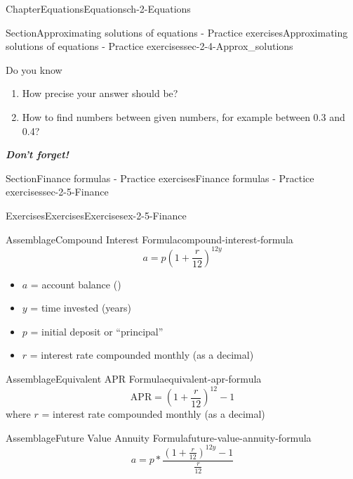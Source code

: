 \documentclass[twoside,11pt,]{book}
\newcommand{\alert}[1]{\textbf{\textit{#1}}}
\numberwithin{equation}{section}
\begin{document}
\begin{chapterptx}{Chapter}{Equations}{}{Equations}{}{}{ch-2-Equations}
\begin{sectionptx}{Section}{Approximating solutions of equations - Practice exercises}{}{Approximating solutions of equations - Practice exercises}{}{}{sec-2-4-Approx_solutions}
\begin{conclusion}{Do you know \textellipsis{}}
\begin{enumerate}[label={\Alph*.}]
\item{}How precise your answer should be?%
\item{}How to find numbers between given numbers, for example between 0.3 and 0.4?%
\end{enumerate}
%
\par
\alert{Don't forget!}%
\end{conclusion}%
\end{sectionptx}
%
%
\typeout{************************************************}
\typeout{************************************************}
%
\begin{sectionptx}{Section}{Finance formulas - Practice exercises}{}{Finance formulas - Practice exercises}{}{}{sec-2-5-Finance}
%
%
\typeout{************************************************}
\typeout{************************************************}
%
\begin{exercises-subsection-numberless}{Exercises}{Exercises}{}{Exercises}{}{}{ex-2-5-Finance}
\begin{assemblage}{Assemblage}{Compound Interest Formula}{compound-interest-formula}%
%
\begin{equation*}
a = p \left( 1 + \frac{r}{12}\right) ^{12y}
\end{equation*}
%
\begin{itemize}[label=\textbullet]
\item{}\(a\) = account balance (\textdollar{})%
\item{}\(y\) = time invested (years)%
\item{}\(p\) = initial deposit or ``principal''%
\item{}\(r\) = interest rate compounded monthly (as a decimal)%
\end{itemize}
%
\end{assemblage}
 \begin{assemblage}{Assemblage}{Equivalent APR Formula}{equivalent-apr-formula}%
%
\begin{equation*}
\text{APR} = \left(1+\frac{r}{12}\right)^{12}-1
\end{equation*}
where \(r\) = interest rate compounded monthly (as a decimal)%
\end{assemblage}
 \begin{assemblage}{Assemblage}{Future Value Annuity Formula}{future-value-annuity-formula}%
%
\begin{equation*}
a = p \ast \frac{\left( 1 + \frac{r}{12}\right) ^{12y}-1}{\frac{r}{12}}
\end{equation*}

\end{assemblage}
\end{exercises-subsection-numberless}
\end{sectionptx}
\end{chapterptx}
\end{document}
